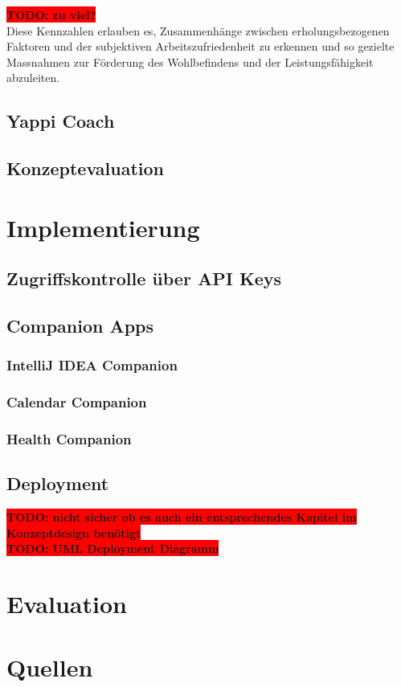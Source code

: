 \documentclass[12pt,a4paper]{report}
\newcommand{\todo}[1]{\colorbox{red}{\textbf{TODO: #1}}\\}
\begin{document}
\todo{zu viel?}
Diese Kennzahlen erlauben es, Zusammenhänge zwischen erholungsbezogenen Faktoren und der subjektiven
Arbeitszufriedenheit zu erkennen und so gezielte Massnahmen zur Förderung des Wohlbefindens und der
Leistungsfähigkeit abzuleiten.

\section{Yappi Coach}
\section{Konzeptevaluation}

\chapter{Implementierung}
\section{Zugriffskontrolle über API Keys}
\section{Companion Apps}
\subsection{IntelliJ IDEA Companion}
\subsection{Calendar Companion}
\subsection{Health Companion}
\section{Deployment}

\todo{nicht sicher ob es auch ein entsprechendes Kapitel im Konzeptdesign benötigt}
\todo{UML Deployment Diagramm}

\chapter{Evaluation}

\chapter{Quellen}
\end{document}
